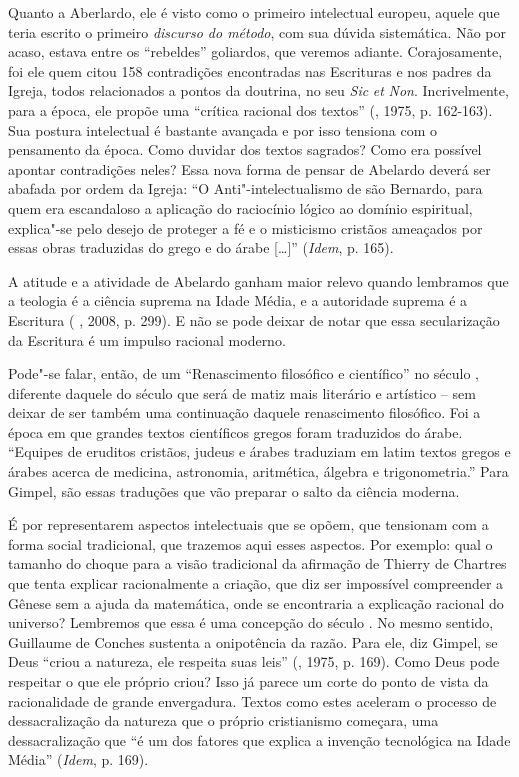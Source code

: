 Quanto a Aberlardo, ele é visto como o primeiro intelectual europeu,
aquele que teria escrito o primeiro \emph{discurso do método}, com sua
dúvida sistemática. Não por acaso, estava entre os ``rebeldes''
goliardos, que veremos adiante. Corajosamente, foi ele quem citou 158
contradições encontradas nas Escrituras e nos padres da Igreja, todos
relacionados a pontos da doutrina, no seu \emph{Sic} \emph{et}
\emph{Non}. Incrivelmente, para a época, ele propõe uma ``crítica
racional dos textos'' (, 1975, p. 162-163). Sua postura
intelectual é bastante avançada e por isso tensiona com o pensamento da
época. Como duvidar dos textos sagrados? Como era possível apontar
contradições neles? Essa nova forma de pensar de Abelardo deverá ser
abafada por ordem da Igreja: ``O Anti"-intelectualismo de são Bernardo,
para quem era escandaloso a aplicação do raciocínio lógico ao domínio
espiritual, explica"-se pelo desejo de proteger a fé e o misticismo
cristãos ameaçados por essas obras traduzidas do grego e do árabe
[\ldots{}]'' (\emph{Idem}, p. 165).

A atitude e a atividade de Abelardo ganham maior relevo quando lembramos
que a teologia é a ciência suprema na Idade Média, e a autoridade
suprema é a Escritura ( , 2008, p. 299). E não se pode deixar de
notar que essa secularização da Escritura é um impulso racional moderno.

Pode"-se falar, então, de um ``Renascimento filosófico e científico'' no
século , diferente daquele do século  que será de matiz mais
literário e artístico -- sem deixar de ser também uma continuação
daquele renascimento filosófico. Foi a época em que grandes textos
científicos gregos foram traduzidos do árabe. ``Equipes de eruditos
cristãos, judeus e árabes traduziam em latim textos gregos e árabes
acerca de medicina, astronomia, aritmética, álgebra e trigonometria.''
Para Gimpel, são essas traduções que vão preparar o salto da ciência
moderna.

É por representarem aspectos intelectuais que se opõem, que tensionam
com a forma social tradicional, que trazemos aqui esses aspectos. Por
exemplo: qual o tamanho do choque para a visão tradicional da afirmação
de Thierry de Chartres que tenta explicar racionalmente a criação, que
diz ser impossível compreender a Gênese sem a ajuda da matemática, onde
se encontraria a explicação racional do universo? Lembremos que essa é
uma concepção do século . No mesmo sentido, Guillaume de Conches
sustenta a onipotência da razão. Para ele, diz Gimpel, se Deus ``criou a
natureza, ele respeita suas leis'' (, 1975, p. 169). Como Deus
pode respeitar o que ele próprio criou? Isso já parece um corte do ponto
de vista da racionalidade de grande envergadura. Textos como estes
aceleram o processo de dessacralização da natureza que o próprio
cristianismo começara, uma dessacralização que ``é um dos fatores que
explica a invenção tecnológica na Idade Média'' (\emph{Idem}, p. 169).

